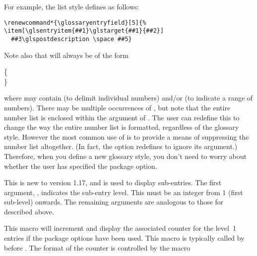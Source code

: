 \documentclass{nlctdoc}
\renewcommand*{\glossaryentryfield}[5]{%
    \item[\glsentryitem{#1}\glstarget{#1}{#2}]\mbox{}\newline
      #3\glspostdescription\space #5\newline}%
\newcommand*{\glostyle}[1]{\textsf{#1}\index{glossary styles:>#1={\protect\ttfamily#1}|main}}
\begin{document}
For example, the 
\glostyle{list} style defines  as follows:
\begin{verbatim}
\renewcommand*{\glossaryentryfield}[5]{%
\item[\glsentryitem{##1}\glstarget{##1}{##2}] 
  ##3\glspostdescription \space ##5}
\end{verbatim}

Note also that  will always be of the form\\
\begin{definition}
\{\\
\}
\end{definition}
where 
may contain  (to delimit individual numbers) and/or
 (to indicate a range of numbers). There may be 
multiple occurrences of 
, but note
that the entire number list is enclosed within the argument
of \linebreak{}. The user can redefine this to change
the way the entire number list is formatted, regardless of 
the glossary style. However the most common use of
 is to provide a means of suppressing the
number list altogether. (In fact, the  option 
redefines  to ignore its argument.)
Therefore, when you define a new glossary style, you don't need
to worry about whether the user has specified the 
 package option.

\begin{definition}[\DescribeMacro{\glossarysubentryfield}]
\end{definition}
This is new to version 1.17, and is used to display sub-entries.
The first argument, , indicates the sub-entry level.
This must be an integer from 1 (first sub-level) onwards. The
remaining arguments are analogous to those for
 described above.

\begin{definition}[\DescribeMacro{\glssubentryitem}]
\end{definition}
This macro will increment and display the associated counter for the
level~1 entries if the  package options have
been used. This macro is typically called by 
before . The format of the counter is controlled by
the macro
\begin{definition}[\DescribeMacro{\glssubentrycounterlabel}]
\end{definition}
\end{document}

